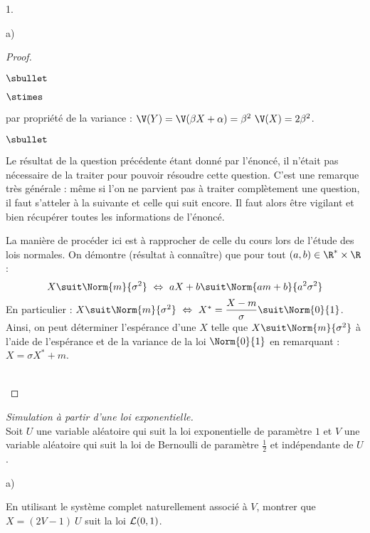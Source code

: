 \documentclass[11pt]{article}%
\begin{document}
\begin{noliste}{1.}
\begin{noliste}{a)}
\begin{proof}
\begin{noliste}{$\sbullet$}
\begin{noliste}{$\stimes$}
        \item par propriété de la variance : $\V(Y) = \V(\beta X +
          \alpha) = \beta^2 \ \V(X) = 2 \beta^2$.
        \end{noliste}
      \end{noliste}
      \begin{remark}%
        \begin{noliste}{$\sbullet$}
        \item Le résultat de la question précédente étant donné par
          l'énoncé, il n'était pas nécessaire de la traiter pour
          pouvoir résoudre cette question. C'est une remarque très
          générale : même si l'on ne parvient pas à traiter
          complètement une question, il faut s'atteler à la suivante
          et celle qui suit encore. Il faut alors être vigilant et
          bien récupérer toutes les informations de l'énoncé.
        \item La manière de procéder ici est à rapprocher de celle du
          cours lors de l'étude des lois normales. On démontre
          (résultat à connaître) que pour tout $(a, b) \in \R^* \times
          \R$ :
          \[
          X \suit \Norm{m}{\sigma^2} \ \Leftrightarrow \ a X + b \suit
          \Norm{am + b}{a^2\sigma^2}
          \]
          En particulier : $X \suit \Norm{m}{\sigma^2} \
          \Leftrightarrow \ X^* = \dfrac{X - m}{\sigma} \suit
          \Norm{0}{1}$.\\
          Ainsi, on peut déterminer l'espérance d'une \var $X$ telle
          que $X \suit \Norm{m}{\sigma^2}$ à l'aide de l'espérance et
          de la variance de la loi $\Norm{0}{1}$ en remarquant : \\
          $X =
          \sigma X^* + m$.
        \end{noliste}
      \end{remark}~\\[-1.2cm]
    \end{proof}
  \end{noliste}

\item {\em Simulation à partir d'une loi exponentielle.}\\
  Soit $U$ une variable aléatoire qui suit la loi exponentielle de
  paramètre $1$ et $V$ une variable aléatoire qui suit la loi de
  Bernoulli de paramètre $\frac{1}{2}$ et indépendante de $U$.
  \begin{noliste}{a)}
    \setlength{\itemsep}{2mm} %
  \item En utilisant le système complet naturellement associé à $V$,
    montrer que $X = (2V-1) \ U$ suit la loi ${\cal L}(0,1)$.


\end{noliste}
\end{noliste}
\end{document}
